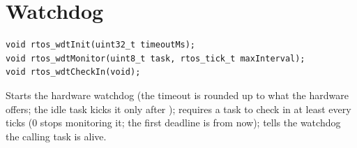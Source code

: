 \section{Watchdog}

\begin{lstlisting}
void rtos_wdtInit(uint32_t timeoutMs);
void rtos_wdtMonitor(uint8_t task, rtos_tick_t maxInterval);
void rtos_wdtCheckIn(void);
\end{lstlisting}
Starts the hardware watchdog (the timeout is rounded up to what the hardware offers;
the idle task kicks it only after ); requires a task to check in at
least every  ticks (0 stops monitoring it; the first deadline is
 from now); tells the watchdog the calling task is alive.
